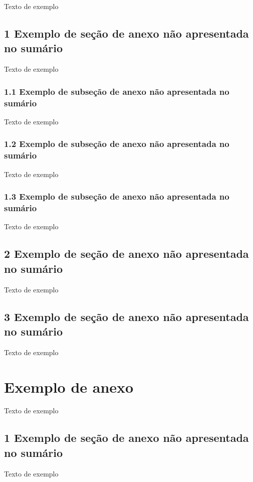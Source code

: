 \documentclass[
	12pt,				%
	oneside,			%
	a4paper,			%
	english,			%
	brazil				%
	]{abntex2ppgsi}
\begin{document}
\begin{anexosenv}
Texto de exemplo

\section*{1 Exemplo de seção de anexo não apresentada no sumário}

Texto de exemplo

\subsection*{1.1 Exemplo de subseção de anexo não apresentada no sumário}

Texto de exemplo

\subsection*{1.2 Exemplo de subseção de anexo não apresentada no sumário}

Texto de exemplo

\subsection*{1.3 Exemplo de subseção de anexo não apresentada no sumário}

Texto de exemplo

\section*{2 Exemplo de seção de anexo não apresentada no sumário}

Texto de exemplo

\section*{3 Exemplo de seção de anexo não apresentada no sumário}

Texto de exemplo

\chapter{Exemplo de anexo}

Texto de exemplo

\section*{1 Exemplo de seção de anexo não apresentada no sumário}

Texto de exemplo


\end{anexosenv}
\end{document}
